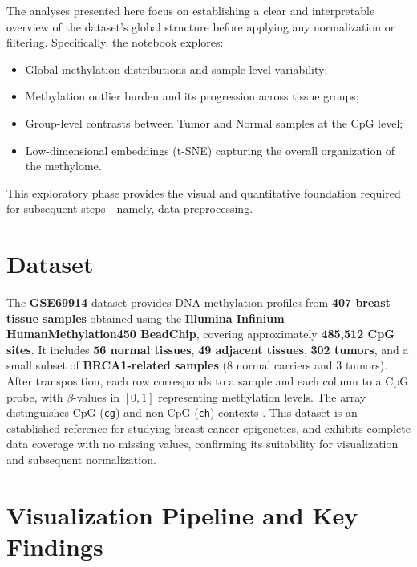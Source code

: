 \documentclass[10pt]{extarticle}
\begin{document}
The analyses presented here focus on establishing a clear and interpretable overview of the dataset’s global structure before applying any normalization or filtering. 
Specifically, the notebook explores:
\begin{itemize}[label=-]
    \item Global methylation distributions and sample-level variability;
    \item Methylation outlier burden and its progression across tissue groups;
    \item Group-level contrasts between Tumor and Normal samples at the CpG level; 
    \item Low-dimensional embeddings (t-SNE) capturing the overall organization of the methylome.
\end{itemize}

This exploratory phase provides the visual and quantitative foundation required for subsequent steps—namely, data preprocessing. 



\section{Dataset}
The \textbf{GSE69914} dataset \cite{ref6} provides DNA methylation profiles from \textbf{407 breast tissue samples} obtained using the \textbf{Illumina Infinium HumanMethylation450 BeadChip}, covering approximately \textbf{485,512 CpG sites}. It includes \textbf{56 normal tissues}, \textbf{49 adjacent tissues}, \textbf{302 tumors}, and a small subset of \textbf{BRCA1-related samples} (8 normal carriers and 3 tumors). After transposition, each row corresponds to a sample and each column to a CpG probe, with $\beta$-values in $[0,1]$ representing methylation levels. The array distinguishes CpG (\texttt{cg}) and non-CpG (\texttt{ch}) contexts \cite{ref9}. This dataset is an established reference for studying breast cancer epigenetics, and exhibits complete data coverage with no missing values, confirming its suitability for visualization and subsequent normalization.




\section{Visualization Pipeline and Key Findings}
\end{document}

